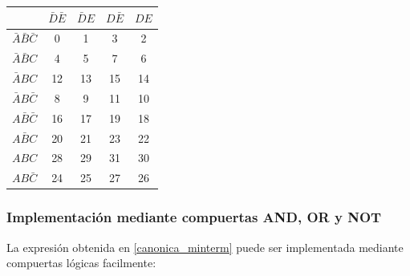     \begin{table}[H]
        \begin{center}
            \def\arraystretch{1.5}
            \begin{tabular}{|c|c|c|c|c|}
                \hline
                &	$\bar{D}\bar{E}$ &	$\bar{D}E$ &	$D\bar{E}$ & $DE$ \\
                \hline
                $\bar{A}\bar{B}\bar{C}$ & 0 & 1 & 3 & 2 \\
                \hline          
                $\bar{A}\bar{B}C$ & 4 & 5 & 7 & 6 \\
                \hline   
                $\bar{A}BC$ & 12 & 13 & 15 & 14 \\
                \hline     
                $\bar{A}B\bar{C}$  & 8 & 9 & 11 & 10 \\
                \hline
                
                $A\bar{B}\bar{C}$ & 16 & 17 & 19 & 18 \\
                
                \hline
                
                $A\bar{B}C$ & 20 & 21 & 23 & 22 \\
                \hline
                
                $ABC$ & 28 & 29 & 31 & 30 \\
                \hline
                
                $AB\bar{C}$ & 24 & 25 & 27 & 26 \\
                \hline
                
            \end{tabular}
        \end{center}

    \end{table}


\subsubsection{Implementación mediante compuertas AND, OR y NOT}

La expresión obtenida en \ref{canonica_minterm} puede ser implementada mediante compuertas lógicas facilmente:

